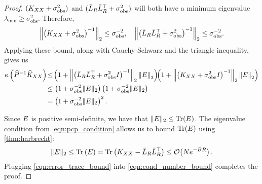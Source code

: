 \begin{proof}
  $(K_{XX} + \sigma^2_\text{obs})$ and $(\bar{L}_R \bar{L}_R^\top + \sigma^2_\text{obs})$ will both have a minimum eigenvalue $\lambda_\text{min} \geq \sigma^2_\text{obs}$.
  Therefore,
  \[
    \left\Vert \left(K_{XX} + \sigma^2_\text{obs} \right)^{-1} \right\Vert_2 \leq \sigma^{-2}_\text{obs},
    \quad
    \left\Vert \left(\bar{L}_R \bar{L}_R^\top + \sigma^2_\text{obs} \right)^{-1} \right\Vert_2 \leq \sigma^{-2}_\text{obs}.
  \]
  Applying these bound, along with Cauchy-Schwarz and the triangle inequality, gives us
  \begin{align}
    \kappa \left( \widehat{P}^{-1}\widehat{K}_{XX} \right) \!
    &\leq \! \left( 1 + \left\Vert \left( \bar{L}_R \bar{L}_R^\top + \sigma^2_\text{obs} I \right)^{-1} \right\Vert_2 \left\Vert E \right\Vert_{2} \right)
      \!\!
      \left( 1 + \left\Vert \left( K_{XX} + \sigma^2_\text{obs} I \right)^{-1} \right\Vert_2 \left\Vert E \right\Vert_{2} \right)
    \nonumber \\
    &\leq
    \left( 1 + \sigma^{-2}_\text{obs} \Vert E \Vert_2 \right)
    \left( 1 + \sigma^{-2}_\text{obs} \Vert E \Vert_2 \right)
    \nonumber \\
    &= \left( 1 + \sigma^{-2}_\text{obs} \Vert E \Vert_2 \right)^2.
    \label{eqn:cond_number_bound}
  \end{align}

  Since $E$ is positive semi-definite, we have that $\Vert \bE \Vert_2 \leq \tr{\bE}$.
  The eigenvalue condition from \cref{eqn:pcp_condition} allows us to bound $\tr{\bE}$ using \cref{thm:harbrecht}:
  \begin{equation}
    \Vert \bE \Vert_2 \leq \tr{\bE}
    =
    \tr{ \bK_{\bX\bX} - \bar\bL_R \bar\bL_R^\top } \leq \bigo{N e^{-BR}}.
    \label{eqn:error_trace_bound}
  \end{equation}
  Plugging \cref{eqn:error_trace_bound} into \cref{eqn:cond_number_bound} completes the proof.
\end{proof}




